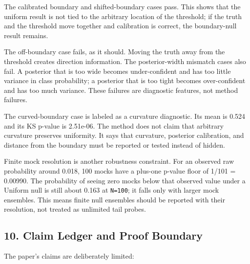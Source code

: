 \documentclass[
]{article}
\begin{document}
The calibrated boundary and shifted-boundary cases pass. This shows that
the uniform result is not tied to the arbitrary location of the
threshold; if the truth and the threshold move together and calibration
is correct, the boundary-null result remains.

The off-boundary case fails, as it should. Moving the truth away from
the threshold creates direction information. The posterior-width
mismatch cases also fail. A posterior that is too wide becomes
under-confident and has too little variance in class probability; a
posterior that is too tight becomes over-confident and has too much
variance. These failures are diagnostic features, not method failures.

The curved-boundary case is labeled as a curvature diagnostic. Its mean
is 0.524 and its KS p-value is 2.51e-06. The method does not claim that
arbitrary curvature preserves uniformity. It says that curvature,
posterior calibration, and distance from the boundary must be reported
or tested instead of hidden.

Finite mock resolution is another robustness constraint. For an observed
raw probability around 0.018, 100 mocks have a plus-one p-value floor of
1/101 = 0.00990. The probability of seeing zero mocks below that
observed value under a Uniform null is still about 0.163 at
\texttt{N=100}; it falls only with larger mock ensembles. This means
finite null ensembles should be reported with their resolution, not
treated as unlimited tail probes.

\subsection{10. Claim Ledger and Proof
Boundary}\label{claim-ledger-and-proof-boundary}

The paper's claims are deliberately limited:
\end{document}
